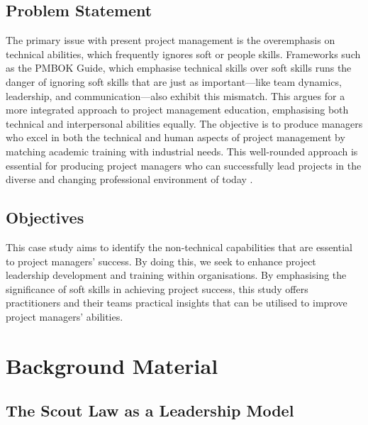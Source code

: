 \documentclass{article}
\begin{document}
\subsection{Problem Statement}
The primary issue with present project management is the overemphasis on technical abilities, which frequently ignores soft or people skills. Frameworks such as the PMBOK Guide, which emphasise technical skills over soft skills runs the danger of ignoring soft skills that are just as important—like team dynamics, leadership, and communication—also exhibit this mismatch. This argues for a more integrated approach to project management education, emphasising both technical and interpersonal abilities equally. The objective is to produce managers who excel in both the technical and human aspects of project management by matching academic training with industrial needs. This well-rounded approach is essential for producing project managers who can successfully lead projects in the diverse and changing professional environment of today \cite{pant2008project}. 



\subsection{Objectives}
This case study aims to identify the non-technical capabilities that are essential to project managers' success. By doing this, we seek to enhance project leadership development and training within organisations. By emphasising the significance of soft skills in achieving project success, this study offers practitioners and their teams practical insights that can be utilised to improve project managers' abilities.

\section{Background Material}
\subsection{The Scout Law as a Leadership Model}
\end{document}
